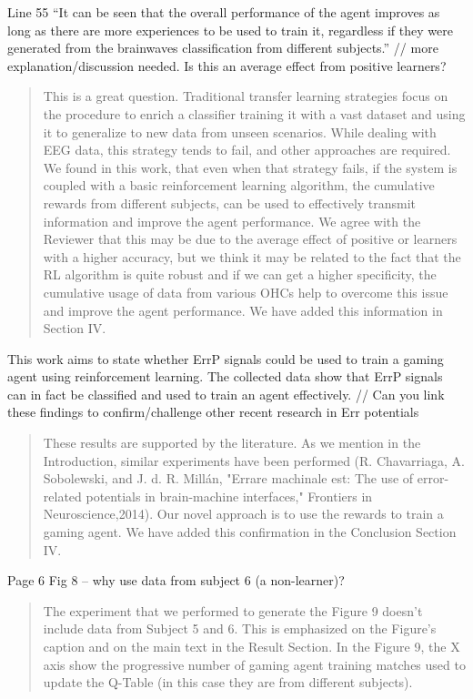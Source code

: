 \documentclass[journal,onecolumn,12pt]{IEEEtran}
\begin{document}
Line 55 “It can be seen that the overall performance of the agent improves as long as there are more experiences to be used to train it, regardless if they were generated from the brainwaves classification from different subjects.” // more explanation/discussion needed. Is this an average effect from positive learners?

\begin{quotation}
{\color{blue}
This is a great question.  Traditional transfer learning strategies focus on the procedure to enrich a classifier training it with a vast dataset and using it to generalize to new data from unseen scenarios.  While dealing with EEG data, this strategy tends to fail, and other approaches are required.  We found in this work, that even when that strategy fails, if the system is coupled with a basic reinforcement learning algorithm, the cumulative rewards from different subjects, can be used to effectively transmit information and improve the agent performance.  We agree with the Reviewer that this may be due to the average effect of positive or learners with a higher accuracy, but we think it may be related to the fact that the RL algorithm is quite robust and if we can get a higher specificity, the cumulative usage of data from various OHCs help to overcome this issue and improve the agent performance.  We have added this information in Section IV.
}
\end{quotation}

This work aims to state whether ErrP signals could be used to train a gaming agent using reinforcement learning. The collected data show that ErrP signals can in fact be classified and used to train an agent effectively. // Can you link these findings to confirm/challenge other recent research in Err potentials

\begin{quotation}
{\color{blue}

These results are supported by the literature. As we mention in the Introduction, similar experiments have been performed (R. Chavarriaga, A. Sobolewski, and J. d. R. Millán, "Errare machinale est: The use of error-related potentials in brain-machine interfaces," Frontiers in Neuroscience,2014).  Our novel approach is to use the rewards to train a gaming agent. 
We have added this confirmation in the Conclusion Section IV.
}
\end{quotation}

Page 6
Fig 8 – why use data from subject 6 (a non-learner)?

\begin{quotation}
{\color{blue}
The experiment that we performed to generate the Figure 9 doesn't include data from Subject 5 and 6. This is emphasized on the Figure's caption and on the main text in the Result Section.  In the Figure 9, the X axis show the progressive number of gaming agent training matches used to update the Q-Table (in this case they are from different subjects).
}
\end{quotation}
\end{document}
